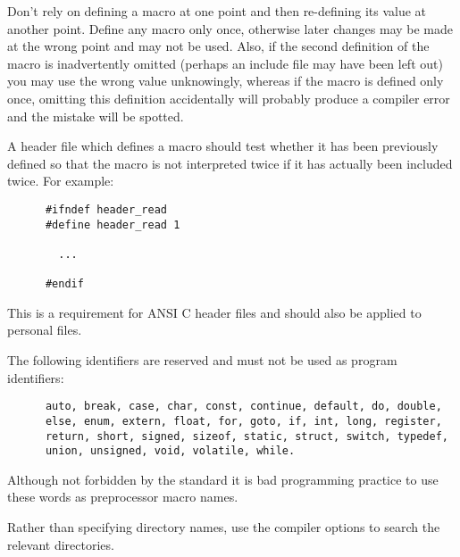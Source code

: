 
Don't rely on defining a macro at one point and then re-defining its
value at another point. Define any macro only once, otherwise later changes may
be made at the wrong point and may not be used. Also, if the second
definition of the macro is inadvertently omitted (perhaps an include 
file may have been left out) you 
may use the wrong value unknowingly, 
whereas if the macro is defined
only once, omitting this definition accidentally will probably produce 
a compiler error and the mistake will be spotted. 



A header file which defines a macro  should test whether it has been
previously defined  so that the macro is
not interpreted twice if it has actually been included twice. For example:
\begin{verbatim}
      #ifndef header_read
      #define header_read 1

        ...

      #endif
\end{verbatim}
This is a requirement for ANSI C header files and should also be applied to 
personal files.


The following identifiers are reserved and must not be used as program 
identifiers:
\begin{verbatim}
      auto, break, case, char, const, continue, default, do, double, 
      else, enum, extern, float, for, goto, if, int, long, register,
      return, short, signed, sizeof, static, struct, switch, typedef, 
      union, unsigned, void, volatile, while.
\end{verbatim}
Although  not forbidden by the standard it is bad programming practice
to use these words as preprocessor macro names.



Rather than specifying directory names, use the
compiler options to search the relevant directories.


